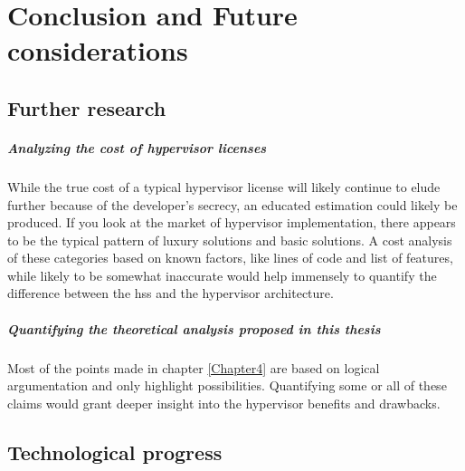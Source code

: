 
\chapter{Conclusion and Future considerations} %

\label{Chapter6} %




\section{Further research}
\paragraph{Analyzing the cost of hypervisor licenses}
While the true cost of a typical hypervisor license will likely continue to elude further because of the developer's secrecy, an educated estimation could likely be produced. If you look at the market of hypervisor implementation, there appears to be the typical pattern of luxury solutions and basic solutions. A cost analysis of these categories based on known factors, like lines of code and list of features, while likely to be somewhat inaccurate would help immensely to quantify the difference between the \acrshort{hss} and the hypervisor architecture.
\paragraph{Quantifying the theoretical analysis proposed in this thesis}
Most of the points made in chapter \ref{Chapter4} are based on logical argumentation and only highlight possibilities. Quantifying some or all of these claims would grant deeper insight into the hypervisor benefits and drawbacks.

\section{Technological progress} \label{tech-progress}
